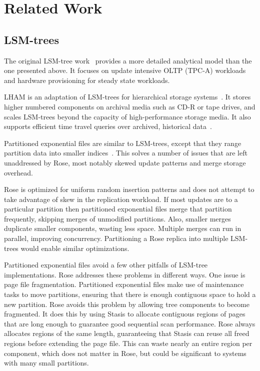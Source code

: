 \documentclass{vldb}
\newcommand{\rows}{Rose\xspace}
\begin{document}
\section{Related Work}

\subsection{LSM-trees}

The original LSM-tree work~\cite{lsm} provides a more detailed
analytical model than the one presented above.  It focuses on update
intensive OLTP (TPC-A) workloads and hardware provisioning for steady
state workloads.

LHAM is an adaptation of LSM-trees for hierarchical storage
systems~\cite{lham}.  It stores higher numbered
components on archival media such as CD-R or tape drives, and
scales LSM-trees beyond the capacity of high-performance storage
media.  It also supports efficient time travel queries over archived, historical
data~\cite{lham}.

Partitioned exponential files are similar to LSM-trees, except that
they range partition data into smaller indices~\cite{partexp}.  This solves a number
of issues that are left unaddressed by \rows, most notably
skewed update patterns and merge storage
overhead.

\rows is optimized for uniform random insertion patterns
and does not attempt to take advantage of skew in the replication
workload.  If most updates are to a particular partition then
partitioned exponential files merge that partition frequently,
skipping merges of unmodified partitions.
Also, smaller merges duplicate smaller components, wasting less space.
Multiple merges can run in parallel, improving concurrency.
Partitioning a \rows
replica into multiple LSM-trees would enable similar optimizations.

Partitioned exponential files avoid a few other pitfalls of LSM-tree
implementations.  \rows addresses these problems in different ways.
One issue is page file fragmentation.  Partitioned exponential files
make use of maintenance tasks to move partitions, ensuring that there
is enough contiguous space to hold a new partition.  \rows avoids this
problem by allowing tree components to become fragmented.  It does
this by using Stasis to allocate contiguous regions of pages that
are long enough to guarantee good sequential scan performance.
\rows always allocates regions of the same length, guaranteeing that
Stasis can reuse all freed regions before extending the page file.
This can waste nearly an entire region per component, which does not
matter in \rows, but could be significant to systems with
many small partitions.
\end{document}
